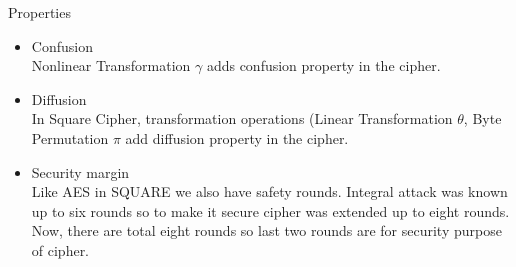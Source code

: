 \begin{frame}{Properties}
\begin{itemize}
    \item {Confusion\\}
         Nonlinear Transformation $\gamma$ adds confusion property in the cipher.
    \item{Diffusion\\}
         In Square Cipher, transformation operations (Linear Transformation $\theta$, Byte Permutation $\pi$ add diffusion property in the cipher.
    \item{Security margin\\}
         Like AES in SQUARE we also have safety rounds. Integral attack was known up to six rounds so to make it secure cipher was extended up to eight rounds. Now, there are total eight rounds so last two rounds are for security purpose of cipher.
\end{itemize}
\end{frame}
% 

